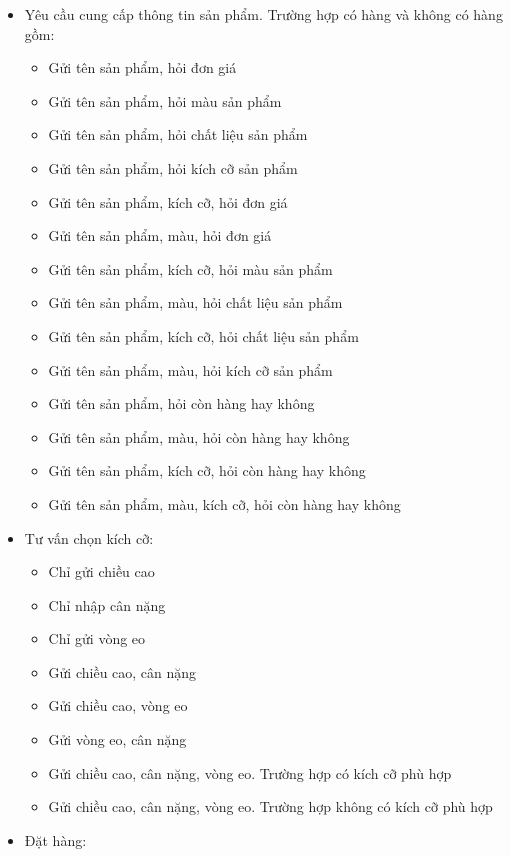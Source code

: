 \begin{itemize}
    \item Yêu cầu cung cấp thông tin sản phẩm. Trường hợp có hàng và không có hàng gồm:
    \begin{itemize}
        \item Gửi tên sản phẩm, hỏi đơn giá
        \item Gửi tên sản phẩm, hỏi màu sản phẩm
        \item Gửi tên sản phẩm, hỏi chất liệu sản phẩm
        \item Gửi tên sản phẩm, hỏi kích cỡ sản phẩm
        \item Gửi tên sản phẩm, kích cỡ, hỏi đơn giá
        \item Gửi tên sản phẩm, màu, hỏi đơn giá
        \item Gửi tên sản phẩm, kích cỡ, hỏi màu sản phẩm
        \item Gửi tên sản phẩm, màu, hỏi chất liệu sản phẩm
        \item Gửi tên sản phẩm, kích cỡ, hỏi chất liệu sản phẩm
        \item Gửi tên sản phẩm, màu, hỏi kích cỡ sản phẩm
        \item Gửi tên sản phẩm, hỏi còn hàng hay không
        \item Gửi tên sản phẩm, màu, hỏi còn hàng hay không
        \item Gửi tên sản phẩm, kích cỡ, hỏi còn hàng hay không
        \item Gửi tên sản phẩm, màu, kích cỡ, hỏi còn hàng hay không
    \end{itemize}
    \item Tư vấn chọn kích cỡ:
    \begin{itemize}
        \item Chỉ gửi chiều cao
        \item Chỉ nhập cân nặng
        \item Chỉ gửi vòng eo
        \item Gửi chiều cao, cân nặng
        \item Gửi chiều cao, vòng eo
        \item Gửi vòng eo, cân nặng
        \item Gửi chiều cao, cân nặng, vòng eo. Trường hợp có kích cỡ phù hợp 
        \item Gửi chiều cao, cân nặng, vòng eo. Trường hợp không có kích cỡ phù hợp
    \end{itemize}
    \item Đặt hàng:
    \begin{itemize}

\end{itemize}
\end{itemize}
